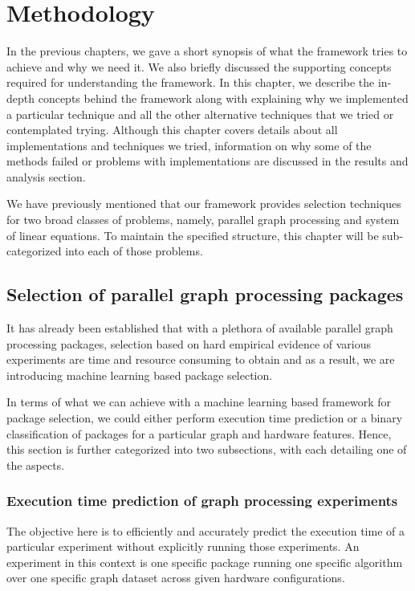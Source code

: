 \chapter{Methodology}  \label{ScalabilityModel}

In the previous chapters, we gave a short synopsis of what the framework tries to achieve and why we need it. We also briefly discussed the supporting concepts required for understanding the framework. In this chapter, we describe the in-depth concepts behind the framework along with explaining why we implemented a particular technique and all the other alternative techniques that we tried or contemplated trying. Although this chapter covers details about all implementations and techniques we tried, information on why some of the methods failed or problems with implementations are discussed in the results and analysis section. 

We have previously mentioned that our framework provides selection techniques for two broad classes of problems, namely, parallel graph processing and system of linear equations. To maintain the specified structure, this chapter will be sub-categorized into each of those problems. 

\section{Selection of parallel graph processing packages}
It has already been established that with a plethora of available parallel graph processing packages, selection based on hard empirical evidence of various experiments are time and resource consuming to obtain and as a result, we are introducing machine learning based package selection.

In terms of what we can achieve with a machine learning based framework for package selection, we could either perform execution time prediction or a binary classification of packages for a particular graph and hardware features. Hence, this section is further categorized into two subsections, with each detailing one of the aspects. 


\subsection{Execution time prediction of graph processing experiments}
The objective here is to efficiently and accurately predict the execution time of a particular experiment without explicitly running those experiments. An experiment in this context is one specific package running one specific algorithm over one specific graph dataset across given hardware configurations.

